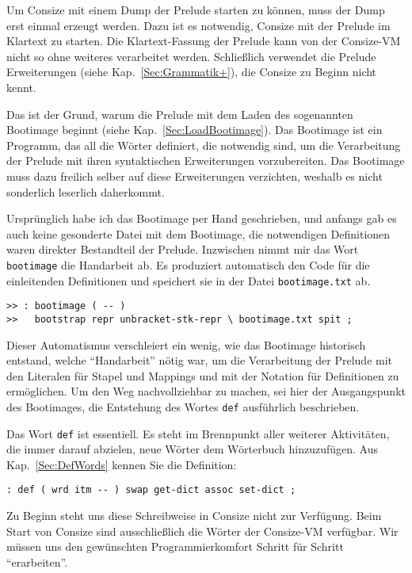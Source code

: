 Um Consize mit einem Dump der Prelude starten zu können, muss der Dump erst einmal erzeugt werden. Dazu ist es notwendig, Consize mit der Prelude im Klartext zu starten. Die Klartext-Fassung der Prelude kann von der Consize-VM nicht so ohne weiteres verarbeitet werden. Schließlich verwendet die Prelude Erweiterungen (siehe Kap.~\ref{Sec:Grammatik+}), die Consize zu Beginn nicht kennt.

Das ist der Grund, warum die Prelude mit dem Laden des sogenannten Bootimage beginnt (siehe Kap.~\ref{Sec:LoadBootimage}). Das Bootimage ist ein Programm, das all die Wörter definiert, die notwendig sind, um die Verarbeitung der Prelude mit ihren syntaktischen Erweiterungen vorzubereiten. Das Bootimage muss dazu freilich selber auf diese Erweiterungen verzichten, weshalb es nicht sonderlich leserlich daherkommt.

Ursprünglich habe ich das Bootimage per Hand geschrieben, und anfangs gab es auch keine gesonderte Datei mit dem Bootimage, die notwendigen Definitionen waren direkter Bestandteil der Prelude. Inzwischen nimmt mir das Wort \verb|bootimage| die Handarbeit ab. Es produziert automatisch den Code für die einleitenden Definitionen und speichert sie in der Datei \verb|bootimage.txt| ab.

\begin{verbatim}        
>> : bootimage ( -- )
>>   bootstrap repr unbracket-stk-repr \ bootimage.txt spit ;
\end{verbatim}

Dieser Automatismus verschleiert ein wenig, wie das Bootimage historisch entstand, welche "`Handarbeit"' nötig war, um die Verarbeitung der Prelude mit den Literalen für Stapel und Mappings und mit der Notation für Definitionen zu ermöglichen. Um den Weg nachvollziehbar zu machen, sei hier der Ausgangspunkt des Bootimages, die Entstehung des Wortes \verb|def| ausführlich beschrieben.

Das Wort \verb|def| ist essentiell. Es steht im Brennpunkt aller weiterer Aktivitäten, die immer darauf abzielen, neue Wörter dem Wörterbuch hinzuzufügen. Aus Kap.~\ref{Sec:DefWords} kennen Sie die Definition:

\begin{verbatim}
: def ( wrd itm -- ) swap get-dict assoc set-dict ;
\end{verbatim}

Zu Beginn steht uns diese Schreibweise in Consize nicht zur Verfügung. Beim Start von Consize sind ausschließlich die Wörter der Consize-VM verfügbar. Wir müssen uns den gewünschten Programmierkomfort Schritt für Schritt "`erarbeiten"'.

